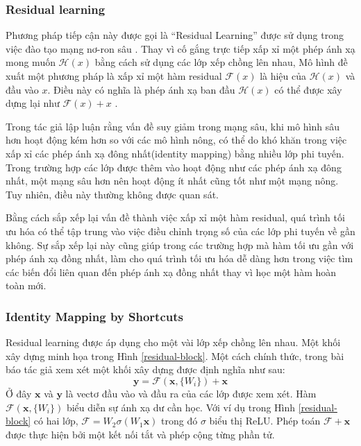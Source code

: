 \subsubsection*{Residual learning}
Phương pháp tiếp cận này được gọi là ``Residual Learning'' được sử dụng trong việc đào tạo mạng nơ-ron sâu . Thay vì cố gắng trực tiếp xấp xỉ một phép ánh xạ mong muốn $\mathcal{H}(x)$ bằng cách sử dụng các lớp xếp chồng lên nhau, Mô hình đề xuất một phương pháp là xấp xỉ một hàm residual $\mathcal{F}(x)$ là hiệu của $\mathcal{H}(x)$ và đầu vào $x$. Điều này có nghĩa là phép ánh xạ ban đầu $\mathcal{H}(x)$ có thể được xây dựng lại như $\mathcal{F}(x) + x$ \cite{he2015deep}.

Trong \cite{he2015deep} tác giả lập luận rằng vấn đề suy giảm trong mạng sâu, khi mô hình sâu hơn hoạt động kém hơn so với các mô hình nông, có thể do khó khăn trong việc xấp xỉ các phép ánh xạ đông nhất(identity mapping) bằng nhiều lớp phi tuyến. Trong trường hợp các lớp được thêm vào hoạt động như các phép ánh xạ đông nhất, một mạng sâu hơn nên hoạt động ít nhất cũng tốt như một mạng nông. Tuy nhiên, điều này thường không được quan sát.

Bằng cách sắp xếp lại vấn đề thành việc xấp xỉ một hàm residual, quá trình tối ưu hóa có thể tập trung vào việc điều chỉnh trọng số của các lớp phi tuyến về gần không. Sự sắp xếp lại này cũng giúp trong các trường hợp mà hàm tối ưu gần với phép ánh xạ đồng nhất, làm cho quá trình tối ưu hóa dễ dàng hơn trong việc tìm các biến đổi liên quan đến phép ánh xạ đồng nhất thay vì học một hàm hoàn toàn mới.

\subsubsection{Identity Mapping by Shortcuts}
Residual learning được áp dụng cho một vài lớp xếp chồng lên nhau. Một khối xây dựng minh họa trong Hình \ref{residual-block}. Một cách chính thức, trong bài báo \cite{he2015deep} tác giả xem xét một khối xây dựng được định nghĩa như sau: 
$$\mathbf{y} = \mathcal{F}(\mathbf{x}, \{W_i\}) + \mathbf{x}$$ 
Ở đây $\mathbf{x}$ và $\mathbf{y}$ là vectơ đầu vào và đầu ra của các lớp được xem xét. Hàm $\mathcal{F}(\mathbf{x}, \{W_i\})$ biểu diễn sự ánh xạ dư cần học. Với ví dụ trong Hình \ref{residual-block} có hai lớp, $\mathcal{F} = W_2 \sigma (W_1 \mathbf{x})$ trong đó $\sigma$ biểu thị ReLU. Phép toán $\mathcal{F} + \mathbf{x}$ được thực hiện bởi một kết nối tắt và phép cộng từng phần tử.

